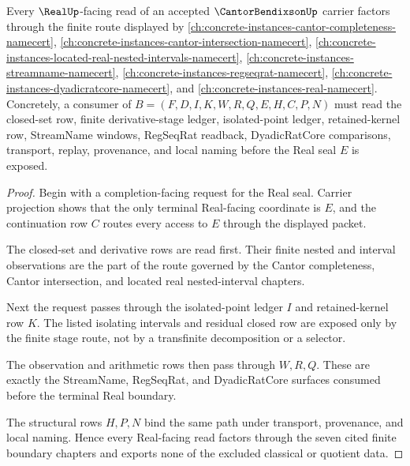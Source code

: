 \begin{theorem}
\label{thm:cantor-bendixson-finite-derivative-handoff}
Every $\RealUp$-facing read of an accepted $\CantorBendixsonUp$ carrier factors through the finite route displayed by \autoref{ch:concrete-instances-cantor-completeness-namecert}, \autoref{ch:concrete-instances-cantor-intersection-namecert}, \autoref{ch:concrete-instances-located-real-nested-intervals-namecert}, \autoref{ch:concrete-instances-streamname-namecert}, \autoref{ch:concrete-instances-regseqrat-namecert}, \autoref{ch:concrete-instances-dyadicratcore-namecert}, and \autoref{ch:concrete-instances-real-namecert}. Concretely, a consumer of $B=(F,D,I,K,W,R,Q,E,H,C,P,N)$ must read the closed-set row, finite derivative-stage ledger, isolated-point ledger, retained-kernel row, StreamName windows, RegSeqRat readback, DyadicRatCore comparisons, transport, replay, provenance, and local naming before the Real seal $E$ is exposed.
\end{theorem}
\begin{proof}
Begin with a completion-facing request for the Real seal. Carrier projection shows that the only terminal Real-facing coordinate is $E$, and the continuation row $C$ routes every access to $E$ through the displayed packet.

The closed-set and derivative rows are read first. Their finite nested and interval observations are the part of the route governed by the Cantor completeness, Cantor intersection, and located real nested-interval chapters.

Next the request passes through the isolated-point ledger $I$ and retained-kernel row $K$. The listed isolating intervals and residual closed row are exposed only by the finite stage route, not by a transfinite decomposition or a selector.

The observation and arithmetic rows then pass through $W,R,Q$. These are exactly the StreamName, RegSeqRat, and DyadicRatCore surfaces consumed before the terminal Real boundary.

The structural rows $H,P,N$ bind the same path under transport, provenance, and local naming. Hence every Real-facing read factors through the seven cited finite boundary chapters and exports none of the excluded classical or quotient data.
\end{proof}


